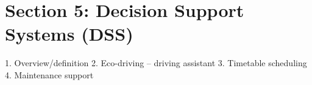


\section{Section 5: Decision Support Systems (DSS)}

1.	Overview/definition
2.	Eco-driving – driving assistant
3.	Timetable scheduling
4.	Maintenance support